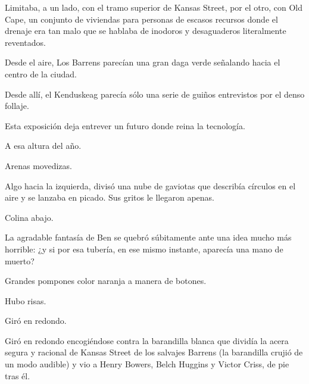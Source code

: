 \sk
Limitaba, a un lado, con el tramo
superior de Kansas Street, por el otro, con Old
Cape, un conjunto de viviendas para personas de
escasos recursos donde el drenaje era tan malo
que se hablaba de inodoros y desaguaderos
literalmente reventados.

\sk
Desde el aire, Los Barrens parecían una
gran daga verde señalando hacia el centro de la
ciudad.

\sk
Desde allí, el Kenduskeag parecía sólo una
serie de guiños entrevistos por el denso follaje.

\sk
Esta exposición deja entrever un futuro donde reina la tecnología.

\sk
A esa altura del año. 

\sk
Arenas movedizas. 

\sk
Algo hacia la izquierda, divisó una nube de
gaviotas que describía círculos en el aire y se
lanzaba en picado.
 Sus gritos le llegaron apenas.

\sk
Colina abajo. 

\sk
La agradable fantasía de Ben se quebró
súbitamente ante una idea mucho más horrible: ¿y
si por esa tubería, en ese mismo instante, aparecía
una mano de muerto?

\sk
Grandes pompones color naranja a manera de botones.

\sk
Hubo risas. 

\sk
Giró en redondo. 

\sk
Giró en redondo encogiéndose
contra la barandilla blanca que dividía la acera
segura y racional de Kansas Street de los salvajes
Barrens (la barandilla crujió de un modo audible) y
vio a Henry Bowers, Belch Huggins y Victor Criss,
de pie tras él.

